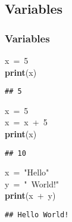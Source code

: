 \documentclass{beamer}\usepackage[]{graphicx}\usepackage[]{color}
\makeatletter
\newcommand{\hlnum}[1]{\textcolor[rgb]{0.686,0.059,0.569}{#1}}%
\newcommand{\hlstr}[1]{\textcolor[rgb]{0.192,0.494,0.8}{#1}}%
\newcommand{\hlopt}[1]{\textcolor[rgb]{0,0,0}{#1}}%
\newcommand{\hlstd}[1]{\textcolor[rgb]{0.345,0.345,0.345}{#1}}%
\newcommand{\hlkwa}[1]{\textcolor[rgb]{0.161,0.373,0.58}{\textbf{#1}}}%
\newenvironment{kframe}{%
 \def\at@end@of@kframe{}%
 \ifinner\ifhmode%
  \def\at@end@of@kframe{\end{minipage}}%
  \begin{minipage}{\columnwidth}%
 \fi\fi%
 \def\FrameCommand##1{\hskip\@totalleftmargin \hskip-\fboxsep
 \colorbox{shadecolor}{##1}\hskip-\fboxsep
     \hskip-\linewidth \hskip-\@totalleftmargin \hskip\columnwidth}%
 \MakeFramed {\advance\hsize-\width
   \@totalleftmargin\z@ \linewidth\hsize
   \@setminipage}}%
 {\par\unskip\endMakeFramed%
 \at@end@of@kframe}
\newenvironment{knitrout}{}{} %
\makeatother
\begin{document}
\subsection{Variables}

\begin{frame}[fragile]
\frametitle{Variables}
\begin{knitrout}
\color{fgcolor}\begin{kframe}
\noindent
\ttfamily
\hlstd{x\ }\hlopt{=\ }\hlstd{}\hlnum{5}\hspace*{\fill}\\
\hlstd{}\hlkwa{print}\hlstd{}\hlopt{(}\hlstd{x}\hlopt{)}\hlstd{}\hspace*{\fill}
\mbox{}
\normalfont

\begin{verbatim}
## 5
\end{verbatim}
\end{kframe}
\end{knitrout}

\begin{knitrout}
\color{fgcolor}\begin{kframe}
\noindent
\ttfamily
\hlstd{x\ }\hlopt{=\ }\hlstd{}\hlnum{5}\hspace*{\fill}\\
\hlstd{x\ }\hlopt{=\ }\hlstd{x\ }\hlopt{+\ }\hlstd{}\hlnum{5}\hspace*{\fill}\\
\hlstd{}\hlkwa{print}\hlstd{}\hlopt{(}\hlstd{x}\hlopt{)}\hlstd{}\hspace*{\fill}
\mbox{}
\normalfont

\begin{verbatim}
## 10
\end{verbatim}
\end{kframe}
\end{knitrout}

\begin{knitrout}
\color{fgcolor}\begin{kframe}
\noindent
\ttfamily
\hlstd{x\ }\hlopt{=\ }\hlstd{}\hlstr{"Hello"}\hlstd{\hspace*{\fill}\\
y\ }\hlopt{=\ }\hlstd{}\hlstr{"\ World!"}\hlstd{}\hspace*{\fill}\\
\hlkwa{print}\hlstd{}\hlopt{(}\hlstd{x\ }\hlopt{+\ }\hlstd{y}\hlopt{)}\hlstd{}\hspace*{\fill}
\mbox{}
\normalfont

\begin{verbatim}
## Hello World!
\end{verbatim}
\end{kframe}
\end{knitrout}


\end{frame}
\end{document}
